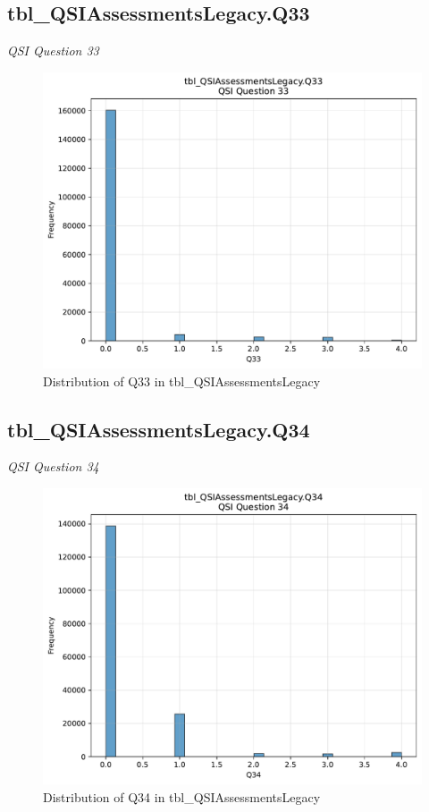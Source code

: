 \subsection{tbl\_QSIAssessmentsLegacy.Q33}
\textit{QSI Question 33}

\begin{figure}[htbp]
\centering
\includegraphics[width=\textwidth]{figures/dbo_tbl_QSIAssessmentsLegacy_Q33.pdf}
\caption{Distribution of Q33 in tbl\_QSIAssessmentsLegacy}
\end{figure}\newpage

\subsection{tbl\_QSIAssessmentsLegacy.Q34}
\textit{QSI Question 34}

\begin{figure}[htbp]
\centering
\includegraphics[width=\textwidth]{figures/dbo_tbl_QSIAssessmentsLegacy_Q34.pdf}
\caption{Distribution of Q34 in tbl\_QSIAssessmentsLegacy}
\end{figure}\newpage

